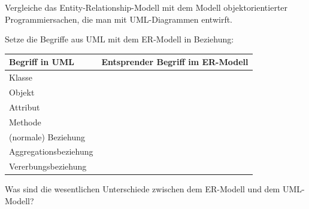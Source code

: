 Vergleiche das Entity-Relationship-Modell mit dem Modell objektorientierter
Programmiersachen, die man mit UML-Diagrammen entwirft.


\begin{compactenum}[a)]
\item Setze die Begriffe aus UML mit dem ER-Modell in Beziehung:

\vspace{2mm}

\bgroup
\def\arraystretch{1.2}
\begin{tabular}{|l|l|}\hline
\textbf{Begriff in UML} & \textbf{Entsprender Begriff im ER-Modell\hspace{2cm}}
\\
\hline Klasse & \\ \hline
Objekt & \\ \hline
Attribut & \\ \hline
Methode & \\ \hline
(normale) Beziehung & \\ \hline
Aggregationsbeziehung & \\ \hline
Vererbungsbeziehung & \\ \hline
\end{tabular}
\egroup

\vspace{2mm}

\item Was sind die wesentlichen Unterschiede zwischen dem ER-Modell und dem
UML-Modell?
\end{compactenum}
